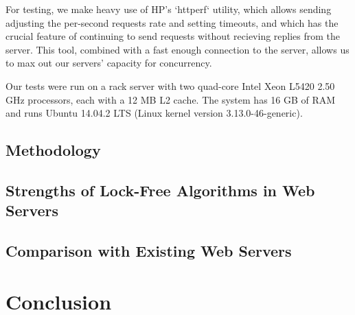 \documentclass[twoside]{article}
\begin{document}
\begin{multicols}{2}
For testing, we make heavy use of HP's `httperf` utility, which allows
sending adjusting the per-second requests rate and setting timeouts,
and which has the crucial feature of continuing to send requests
without recieving replies from the server. This tool, combined with a
fast enough connection to the server, allows us to max out our
servers' capacity for concurrency.

Our tests were run on a rack server with two quad-core Intel Xeon
L5420 2.50 GHz processors, each with a 12 MB L2 cache. The system has
16 GB of RAM and runs Ubuntu 14.04.2 LTS (Linux kernel version
3.13.0-46-generic).

\subsection{Methodology}
\subsection{Strengths of Lock-Free Algorithms in Web Servers}
\subsection{Comparison with Existing Web Servers}
\section{Conclusion}

\end{multicols}
\end{document}
